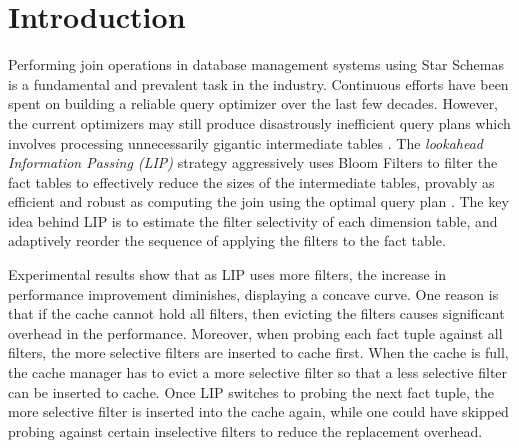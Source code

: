 \documentclass[10pt]{article}
\begin{document}
\newpage
\maketitle




\section{Introduction}

Performing join operations in database management systems using Star Schemas is a fundamental and prevalent task in the industry. Continuous efforts have been spent on building a reliable query optimizer over the last few decades. However, the current optimizers may still produce disastrously inefficient query plans which involves processing unnecessarily gigantic intermediate tables \cite{leis2015good,rabl2013variations}. The \textit{lookahead Information Passing (LIP)} strategy aggressively uses Bloom Filters to filter the fact tables to effectively reduce the sizes of the intermediate tables, provably as efficient and robust as computing the join using the optimal query plan \cite{zhu2017looking}. The key idea behind LIP is to estimate the filter selectivity of each dimension table, and adaptively reorder the sequence of applying the filters to the fact table.  

Experimental results show that as LIP uses more filters, the increase in performance improvement diminishes, displaying a concave curve. One reason is that if the cache cannot hold all filters, then evicting the filters causes significant overhead in the performance. Moreover, when probing each fact tuple against all filters, the more selective filters are inserted to cache first. When the cache is full, the cache manager has to evict a more selective filter so that a less selective filter can be inserted to cache. Once LIP switches to probing the next fact tuple, the more selective filter is inserted into the cache again, while one could have skipped probing against certain inselective filters to reduce the replacement overhead.
\end{document}
